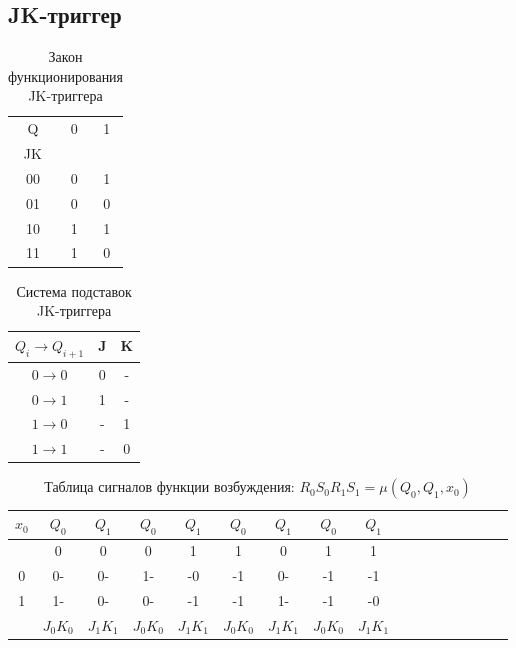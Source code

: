 \documentclass[a4paper,10pt]{article}
\begin{document}
    \subsection*{JK-триггер}
            \begin{table}[h!]
                \center
                \begin{tabular}{|c|c|c|}
                    \hline
                     Q  & 0 & 1 \\
                     JK &   &   \\ \hline
                     00 & 0 & 1 \\ \hline
                     01 & 0 & 0 \\ \hline
                     10 & 1 & 1 \\ \hline
                     11 & 1 & 0 \\ \hline
                \end{tabular}
                \caption{Закон функционирования JK-триггера}
            \end{table}
            \begin{table}[h!]
                \center
                \begin{tabular}{|c|c|c|}
                    \hline
            $Q_i \to Q_{i+1}$  & J & K \\ \hline
                     $0 \to 0$ & 0 & - \\ \hline
                     $0 \to 1$ & 1 & - \\ \hline
                     $1 \to 0$ & - & 1 \\ \hline
                     $1 \to 1$ & - & 0 \\ \hline
                \end{tabular}
                \caption{Система подставок JK-триггера}
            \end{table}
            \begin{table}[h!]
                \center
                \begin{tabular}{|c||c|c||c|c||c|c||c|c||c|c||c|c||c|c||c|c|}
                 \hline
                 $x_0$ &  $Q_0$ & $Q_1$  &  $Q_0$ & $Q_1$  &  $Q_0$ & $Q_1$  &  $Q_0$ & $Q_1$ \\ \hline
                       &    0   &   0    &    0   &   1    &    1   &   0    &    1   &   1   \\ \hline
                    0  &   0-   &  0-    &   1-   &  -0    &   -1   &  0-    &   -1   &  -1   \\ \hline
                    1  &   1-   &  0-    &   0-   &  -1    &   -1   &  1-    &   -1   &  -0   \\ \hline
                       &$J_0K_0$&$J_1K_1$&$J_0K_0$&$J_1K_1$&$J_0K_0$&$J_1K_1$&$J_0K_0$&$J_1K_1$ \\ \hline
                \end{tabular}
                \caption{Таблица сигналов функции возбуждения: $R_0S_0R_1S_1 = \mu(Q_0,Q_1,x_0)$}
            \end{table}
\end{document}
